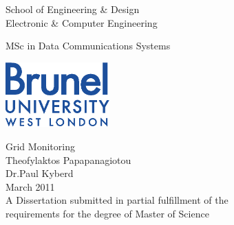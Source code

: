 \thispagestyle{empty}

\begin{center}
\Large
School of Engineering \& Design\\
Electronic \& Computer Engineering\\
\vspace{1\baselineskip}

MSc in Data Communications Systems\\
\vspace{1\baselineskip}

\begin{center}
\includegraphics[width=40mm]{images/brunel_logo.eps}\\
\end{center}
\vspace{0.5\baselineskip}

\Huge
Grid Monitoring\\
\vspace{1.5\baselineskip}
\Huge
Theofylaktos Papapanagiotou\\
Dr.Paul Kyberd\\
\vspace{1\baselineskip}
\large
March 2011\\
\vspace{0.5\baselineskip}
\large
A Dissertation submitted in partial fulfillment of the\\
requirements for the degree of Master of Science
\end{center}

